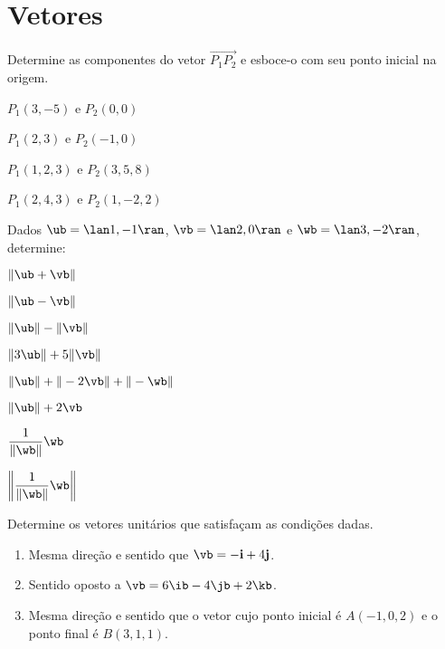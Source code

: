 \section{Vetores}
 

\item Determine as componentes do vetor $\overrightarrow{P_1P_2}$ e esboce-o com seu ponto inicial na origem.
\begin{enumerate}
    \begin{multicols}{2}
    \item $P_1(3,-5)$ e $P_2(0,0)$
    \item $P_1(2,3)$ e $P_2(-1,0)$
    \item $P_1(1,2,3)$ e $P_2(3,5,8)$
    \item $P_1(2,4,3)$ e $P_2(1,-2,2)$
    \end{multicols}
\end{enumerate}
\item Dados $\ub=\lan 1,-1\ran$, $\vb=\lan 2,0\ran$ e $\wb=\lan 3,-2\ran$, determine:%
\begin{enumerate}[leftmargin=*]
    \begin{multicols}{2}
    \item $\|\ub+\vb\|$
    \item $\|\ub - \vb\|$
    \item $\|\ub\|-\|\vb\|$
    \item $\|3\ub\|+5\|\vb\|$
    \item $\|\ub\|+\|-2\vb\|+\|-\wb\|$
    \item $\|\ub\|+2\vb$
    \item $\dfrac{1}{\|\wb\|}\wb$
    \item $\left\|\dfrac{1}{\|\wb\|}\wb\right\|$
    \end{multicols}
\end{enumerate}
  \item[\textcolor{blue}{3-4}] Determine os vetores unitários que satisfaçam as condições dadas.

\item 
    \begin{enumerate}[leftmargin=*]
        \item Mesma direção e sentido que $\vb=-\mathbf{i} + 4\mathbf{j}$.
        \item Sentido oposto a $\vb=6\ib-4\jb+2\kb$.
        \item Mesma direção e sentido que o vetor cujo ponto inicial é $A(-1,0,2)$ e o ponto final é $B(3,1,1)$.%
        
       
    \end{enumerate}


